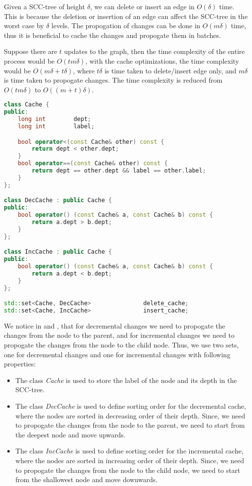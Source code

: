 Given a SCC-tree of height $\delta$, we can delete or insert an edge in $O(\delta)$ time. This is because the deletion or insertion of an edge can affect the SCC-tree in the worst case by $\delta$ levels.
The propogation of changes can be done in $O(m\delta)$ time, thus it is beneficial to cache the changes and propogate them in batches.

Suppose there are $t$ updates to the graph, then the time complexity of the entire process would be $O(tm\delta)$, with the cache optimizations, the time complexity would be $O(m\delta + t\delta)$,
where $t\delta$ is time taken to delete/insert edge only, and $m\delta$ is time taken to propogate changes. The time complexity is reduced from $O(tm\delta)$ to $O((m + t)\delta)$.

\begin{lstlisting}[language=C++, caption={Cache Optimizations}, label={lst:cache_optimizations}]
class Cache {
public:
    long int        dept;
    long int        label;

    bool operator<(const Cache& other) const {
        return dept < other.dept;
    }
    bool operator==(const Cache& other) const {
        return dept == other.dept && label == other.label;
    }
};

class DecCache : public Cache {
public:
    bool operator() (const Cache& a, const Cache& b) const {
        return a.dept > b.dept;
    }
};

class IncCache : public Cache {
public:
    bool operator() (const Cache& a, const Cache& b) const {
        return a.dept < b.dept;
    }
};

std::set<Cache, DecCache>               delete_cache;
std::set<Cache, IncCache>               insert_cache;
\end{lstlisting}

We notice in \secref{\ref{Subsec: Decremental Maintaince of SCC Tree}} and \secref{\ref{Subsec: Incremental Maintaince of SCC Tree}}, 
that for decremental changes we need to propogate the changes from the node to the parent, and for incremental changes we need to propogate the changes from the node to the child node.
Thus, we use two sets, one for decremental changes and one for incremental changes with following properties:
\begin{itemize}
    \item The class \textit{Cache} is used to store the label of the node and its depth in the SCC-tree.
    \item The class \textit{DecCache} is used to define sorting order for the decremental cache, where the nodes are sorted in decreasing order of their depth.
Since, we need to propogate the changes from the node to the parent, we need to start from the deepest node and move upwards.
    \item The class \textit{IncCache} is used to define sorting order for the incremental cache, where the nodes are sorted in increasing order of their depth.
Since, we need to propogate the changes from the node to the child node, we need to start from the shallowest node and move downwards.

\end{itemize}

